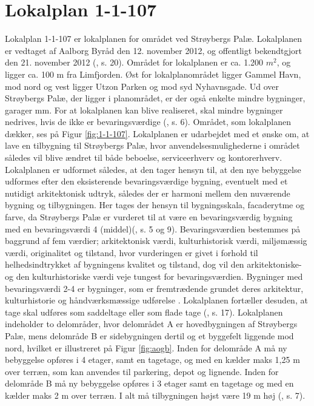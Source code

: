 \section{Lokalplan 1-1-107}
Lokalplan 1-1-107 er lokalplanen for området ved Strøybergs Palæ. Lokalplanen er vedtaget af Aalborg Byråd den 12. november 2012, og offentligt bekendtgjort den 21. november 2012 (\citep{lokalplan}, s. 20).
\newline \indent{     }  Området for lokalplanen er ca. 1.200 $m^2$, og ligger ca. 100 m fra Limfjorden. Øst for lokalplanområdet ligger Gammel Havn, mod nord og vest ligger Utzon Parken og mod syd Nyhavnsgade. Ud over Strøybergs Palæ, der ligger i planområdet, er der også enkelte mindre bygninger, garager mm. For at lokalplanen kan blive realiseret, skal mindre bygninger nedrives, hvis de ikke er bevaringsværdige (\citep{lokalplan}, s. 6). Området, som lokalplanen dækker, ses på Figur \ref{fig:1-1-107}.
\newline \indent{     }  Lokalplanen er udarbejdet med et ønske om, at lave en tilbygning til Strøybergs Palæ, hvor anvendelsesmulighederne i området således vil blive ændret til både beboelse, serviceerhverv og kontorerhverv. Lokalplanen er udformet således, at den tager hensyn til, at den nye bebyggelse udformes efter den eksisterende bevaringsværdige bygning, eventuelt med et nutidigt arkitektonisk udtryk, således der er harmoni mellem den nuværende bygning og tilbygningen. Her tages der hensyn til bygningsskala, facaderytme og farve, da Strøybergs Palæ er vurderet til at være en bevaringsværdig bygning med en bevaringsværdi 4 (middel)(\citep{lokalplan}, s. 5 og 9). Bevaringsværdien bestemmes på baggrund af fem værdier; arkitektonisk værdi, kulturhistorisk værdi, miljømæssig værdi, originalitet og tilstand, hvor vurderingen er givet i forhold til helhedsindtrykket af bygningens kvalitet og tilstand, dog vil den arkitektoniske- og den kulturhistoriske værdi veje tungest for bevaringsværdien. Bygninger med bevaringsværdi 2-4 er bygninger, som er fremtrædende grundet deres arkitektur, kulturhistorie og håndværksmæssige udførelse \citep{bevaringsvaerdi}. Lokalplanen fortæller desuden, at tage skal udføres som saddeltage eller som flade tage (\citep{lokalplan}, s. 17).
\newline \indent{     }  Lokalplanen indeholder to delområder, hvor delområdet A er hovedbygningen af Strøybergs Palæ, mens delområde B er sidebygningen dertil og et byggefelt liggende mod nord, hvilket er illustreret på Figur \ref{fig:aogb}. Inden for delområde A må ny bebyggelse opføres i 4 etager, samt en tagetage, og med en kælder maks 1,25 m over terræn, som kan anvendes til parkering, depot og lignende. Inden for delområde B må ny bebyggelse opføres i 3 etager samt en tagetage og med en kælder maks 2 m over terræn. I alt må tilbygningen højst være 19 m høj (\citep{lokalplan}, s. 7).

